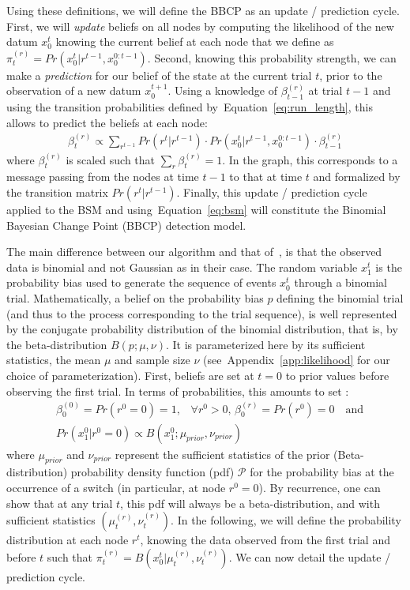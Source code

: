 \documentclass[12pt,english]{article}%
\newcommand{\eqa}[1]{\begin{align}#1\end{align}}
\newcommand{\Pp}{\mathcal{P}}
\newcommand{\citep}[1]{\parencite{#1}}
\newcommand{\seeEq}[1]{Equation~\ref{eq:#1}}
\newcommand{\seeApp}[1]{Appendix~\ref{app:#1}}
\begin{document}
Using these definitions, we will define the BBCP
as an update / prediction cycle.
First, we will \emph{update} beliefs on all nodes
by computing the likelihood of the new datum $x_0^t$ 
knowing the current belief at each node
that we define as $\pi^{(r)}_t=Pr(x_0^t | r^{t-1}, x_0^{0:t-1})$.
Second, knowing this probability strength, %
we can make a \emph{prediction} for our belief of the state at the current trial $t$,
prior to the observation of a new datum $x_0^{t+1}$.
Using a knowledge of $\beta^{(r)}_{t-1}$ at trial $t-1$ and
using the transition probabilities defined by~\seeEq{run_length},
this allows to predict the beliefs at each node:
\eqa{
\beta^{(r)}_t \propto \sum_{r^{t-1}}  Pr(r^t | r^{t-1}) \cdot  Pr(x_0^t | r^{t-1}, x_0^{0:t-1}) \cdot  \beta^{(r)}_{t-1}
\label{eq:pred_node}
}
where $\beta^{(r)}_t$ is scaled such that $\sum_r \beta^{(r)}_t = 1$.
In the graph, this corresponds to a message passing from the nodes at time $t-1$
to that at time $t$ and formalized by the transition matrix $Pr(r^t | r^{t-1})$.
Finally, this update / prediction cycle applied to the BSM and using~\seeEq{bsm}
will constitute the Binomial Bayesian Change Point (BBCP) detection model.

The main difference between our algorithm and that of~\citep{AdamsMackay2007},
is that the observed data is binomial and not Gaussian as in their case.
The random variable $x_1^t$ is the probability bias used
to generate the sequence of events $x_0^t$ through a binomial trial.
Mathematically, a belief on the probability bias $p$ defining the binomial trial (and thus to the process corresponding to the trial sequence),
is well represented by the conjugate probability distribution of the binomial distribution,
that is, by the beta-distribution $B(p; \mu, \nu)$.
It is parameterized here by its sufficient statistics,
the mean $\mu$ and sample size $\nu$
(see~\seeApp{likelihood} for our choice of parameterization).
First, beliefs are set at $t=0$ to prior values before observing the first trial.
In terms of probabilities, this amounts to set :
\eqa{
& \beta^{(0)}_0=Pr(r^0=0)=1 \text{,}\quad \forall r^0>0 \text{, } \beta^{(r)}_0=Pr(r^0)=0 \quad \text{and} \\
& Pr(x_1^0 | r^0=0) \propto B(x_1^0; \mu_{prior}, \nu_{prior})
}
where $\mu_{prior}$ and $\nu_{prior}$ represent the sufficient statistics
of the prior (Beta-distribution) probability density function (pdf) $\Pp$
for the probability bias
at the occurrence of a switch (in particular, at node $r^0=0$).
By recurrence, one can show that at any trial $t$,
this pdf will always be a beta-distribution,
and with sufficient statistics $(\mu^{(r)}_{t}, \nu^{(r)}_{t})$.
In the following, we will define the probability distribution at each node $r^t$,
knowing the data observed from the first trial and before $t$ such that
$
\pi^{(r)}_t = B( x_0^t |  \mu^{(r)}_{t}, \nu^{(r)}_{t})
$. %
We can now detail the update / prediction cycle.
\end{document}
